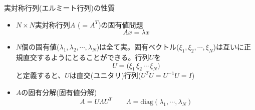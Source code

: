 \begin{frame}[t,fragile]{実対称行列(エルミート行列)の性質}
  \begin{itemize}
  \item $N \times N$実対称行列$A$ ($=A^T$)の固有値問題
    \[
    A x = \lambda x
    \]
  \item $N$個の固有値($\lambda_1,\lambda_2,\cdots,\lambda_N$)は全て実。固有ベクトル($\xi_1,\xi_2,\cdots,\xi_N$)は互いに正規直交するようにとることができる。行列$U$を
    \[
    U = \Big( \xi_1 \, \xi_2 \, \cdots \, \xi_N \Big)
    \]
    と定義すると、$U$は直交(ユニタリ)行列($U^T U = U^{-1} U = I$)
  \item $A$の固有分解(固有値分解)
    \[
    A = U \Lambda U^T \qquad \Lambda = \text{diag}(\lambda_1,\cdots,\lambda_N)
    \]
  \end{itemize}
\end{frame}
